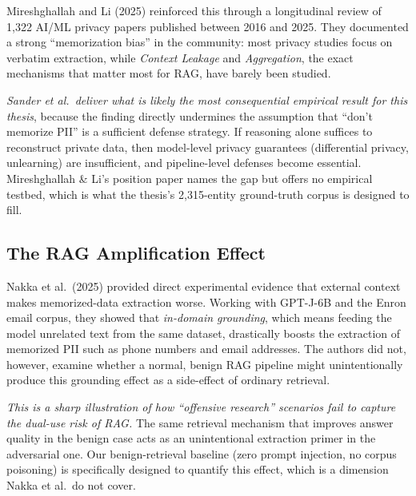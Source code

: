 \documentclass[12pt, a4paper]{article}
\begin{document}
Mireshghallah and Li (2025) reinforced this through a longitudinal review of 1{,}322 AI/ML privacy papers published between 2016 and 2025. They documented a strong ``memorization bias'' in the community: most privacy studies focus on verbatim extraction, while \emph{Context Leakage} and \emph{Aggregation}, the exact mechanisms that matter most for RAG, have barely been studied.

\begin{critbox}
\textit{Sander et al.\ deliver what is likely the most consequential empirical result for this thesis}, because the finding directly undermines the assumption that ``don't memorize PII'' is a sufficient defense strategy. If reasoning alone suffices to reconstruct private data, then model-level privacy guarantees (differential privacy, unlearning) are insufficient, and pipeline-level defenses become essential. Mireshghallah \& Li's position paper names the gap but offers no empirical testbed, which is what the thesis's 2{,}315-entity ground-truth corpus is designed to fill.
\end{critbox}

\subsection{The RAG Amplification Effect}
\label{subsec:rag-amplification}

Nakka et al.\ (2025) provided direct experimental evidence that external context makes memorized-data extraction worse. Working with GPT-J-6B and the Enron email corpus, they showed that \emph{in-domain grounding}, which means feeding the model unrelated text from the same dataset, drastically boosts the extraction of memorized PII such as phone numbers and email addresses. The authors did not, however, examine whether a normal, benign RAG pipeline might unintentionally produce this grounding effect as a side-effect of ordinary retrieval.

\begin{critbox}
\textit{This is a sharp illustration of how ``offensive research'' scenarios fail to capture the dual-use risk of RAG.} The same retrieval mechanism that improves answer quality in the benign case acts as an unintentional extraction primer in the adversarial one. Our benign-retrieval baseline (zero prompt injection, no corpus poisoning) is specifically designed to quantify this effect, which is a dimension Nakka et al.\ do not cover.
\end{critbox}
\end{document}

